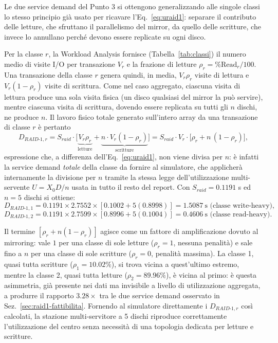 \documentclass[11pt,a4paper]{article}
\begin{document}
Le due service demand del Punto 3 si ottengono generalizzando alle singole classi lo stesso
principio già usato per ricavare l'Eq.~\eqref{eq:uraid1}: separare il contributo delle letture, che
sfruttano il parallelismo del mirror, da quello delle scritture, che invece lo annullano perché
devono essere replicate su ogni disco.

Per la classe $r$, la Workload Analysis fornisce (Tabella~\ref{tab:classi}) il numero medio di
visite I/O per transazione $V_r$ e la frazione di letture $\rho_r=\%\text{Read}_r/100$. Una
transazione della classe $r$ genera quindi, in media, $V_r\rho_r$ visite di lettura e
$V_r(1-\rho_r)$ visite di scrittura. Come nel caso aggregato, ciascuna visita di lettura produce
una sola visita fisica (un disco qualsiasi del mirror la può servire), mentre ciascuna visita di
scrittura, dovendo essere replicata su tutti gli $n$ dischi, ne produce $n$. Il lavoro fisico totale
generato sull'intero array da una transazione di classe $r$ è pertanto
\begin{equation}
D_{RAID\text{-}1,r} = S_{raid}\cdot\Big[\underbrace{V_r\rho_r}_{\text{letture}}
+ \underbrace{n\cdot V_r(1-\rho_r)}_{\text{scritture}}\Big]
= S_{raid}\cdot V_r\cdot\big[\rho_r + n\,(1-\rho_r)\big],
\label{eq:draid1-perclasse}
\end{equation}
espressione che, a differenza dell'Eq.~\eqref{eq:uraid1}, non viene divisa per $n$: è infatti la
service demand \emph{totale} della classe da fornire al simulatore, che applicherà internamente la
divisione per $n$ tramite la stessa legge dell'utilizzazione multi-servente $U=X_0 D/n$ usata in
tutto il resto del report. Con $S_{raid}=0.1191$ s ed $n=5$ dischi si ottiene:
\[
D_{RAID\text{-}1,1}=0.1191\times 2.7552\times[0.1002+5(0.8998)]=1.5087\ \text{s (classe write-heavy)},
\]
\[
D_{RAID\text{-}1,2}=0.1191\times 2.7599\times[0.8996+5(0.1004)]=0.4606\ \text{s (classe read-heavy)}.
\]

Il termine $[\rho_r+n(1-\rho_r)]$ agisce come un fattore di amplificazione dovuto al mirroring: vale
$1$ per una classe di sole letture ($\rho_r=1$, nessuna penalità) e sale fino a $n$ per una classe di
sole scritture ($\rho_r=0$, penalità massima). La classe 1, quasi tutta scritture
($\rho_1=10.02\%$), si trova vicina a quest'ultimo estremo, mentre la classe 2, quasi tutta letture
($\rho_2=89.96\%$), è vicina al primo: è questa asimmetria, già presente nei dati ma invisibile a
livello di utilizzazione aggregata, a produrre il rapporto $3.28\times$ tra le due service demand
osservato in Sez.~\ref{sec:raid1-fattibilita}. Fornendo al simulatore direttamente i
$D_{RAID\text{-}1,r}$ così calcolati, la stazione multi-servitore a 5 dischi riproduce correttamente
l'utilizzazione del centro senza necessità di una topologia dedicata per letture e scritture.
\end{document}
